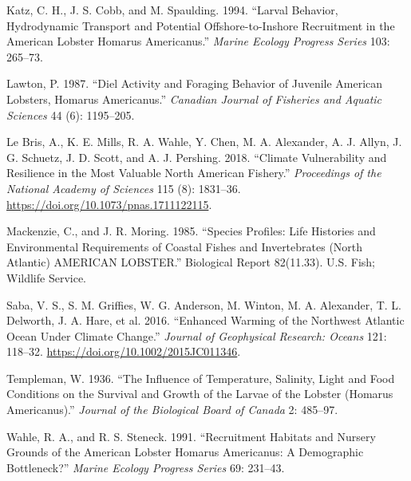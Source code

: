 \documentclass[
  letterpaper,
  DIV=11,
  numbers=noendperiod]{scrartcl}
\newlength{\cslhangindent}
\newenvironment{CSLReferences}[2] %
 {\begin{list}{}{%
  \setlength{\itemindent}{0pt}
  \setlength{\leftmargin}{0pt}
  \setlength{\parsep}{0pt}
  \ifodd #1
   \setlength{\leftmargin}{\cslhangindent}
   \setlength{\itemindent}{-1\cslhangindent}
  \fi
  \setlength{\itemsep}{#2\baselineskip}}}
 {\end{list}}
\begin{document}
\begin{CSLReferences}{1}{0}
Katz, C. H., J. S. Cobb, and M. Spaulding. 1994. {``Larval Behavior,
Hydrodynamic Transport and Potential Offshore-to-Inshore Recruitment in
the {American} Lobster {Homarus} Americanus.''} \emph{Marine Ecology
Progress Series} 103: 265--73.

Lawton, P. 1987. {``Diel Activity and Foraging Behavior of Juvenile
{American} Lobsters, {Homarus} Americanus.''} \emph{Canadian Journal of
Fisheries and Aquatic Sciences} 44 (6): 1195--205.

Le Bris, A., K. E. Mills, R. A. Wahle, Y. Chen, M. A. Alexander, A. J.
Allyn, J. G. Schuetz, J. D. Scott, and A. J. Pershing. 2018. {``Climate
Vulnerability and Resilience in the Most Valuable {North American}
Fishery.''} \emph{Proceedings of the National Academy of Sciences} 115
(8): 1831--36. \url{https://doi.org/10.1073/pnas.1711122115}.

Mackenzie, C., and J. R. Moring. 1985. {``Species Profiles: Life
Histories and Environmental Requirements of Coastal Fishes and
Invertebrates ({North Atlantic}) {AMERICAN LOBSTER}.''} Biological
Report 82(11.33). U.S. Fish; Wildlife Service.

Saba, V. S., S. M. Griffies, W. G. Anderson, M. Winton, M. A. Alexander,
T. L. Delworth, J. A. Hare, et al. 2016. {``Enhanced Warming of the
{Northwest Atlantic Ocean} Under Climate Change.''} \emph{Journal of
Geophysical Research: Oceans} 121: 118--32.
\url{https://doi.org/10.1002/2015JC011346}.

Templeman, W. 1936. {``The Influence of Temperature, Salinity, Light and
Food Conditions on the Survival and Growth of the Larvae of the Lobster
({Homarus} Americanus).''} \emph{Journal of the Biological Board of
Canada} 2: 485--97.

Wahle, R. A., and R. S. Steneck. 1991. {``Recruitment Habitats and
Nursery Grounds of the {American} Lobster {Homarus} Americanus: A
Demographic Bottleneck?''} \emph{Marine Ecology Progress Series} 69:
231--43.

\end{CSLReferences}
\end{document}
